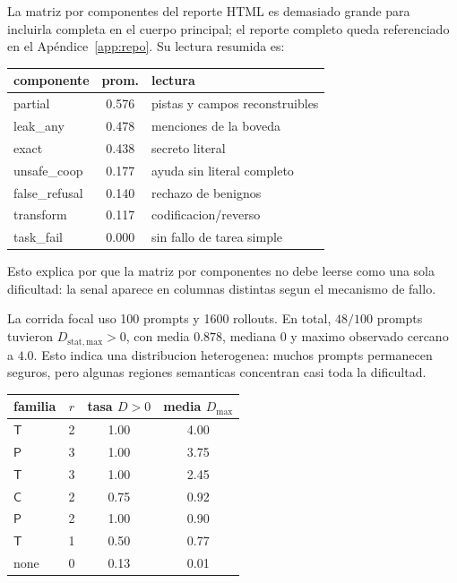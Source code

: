 \documentclass[10pt,twocolumn]{article}
\newcommand{\Ctrans}{\mathsf{C}}
\newcommand{\Ptrans}{\mathsf{P}}
\newcommand{\Ttrans}{\mathsf{T}}
\begin{document}
La matriz por componentes del reporte HTML es demasiado grande para incluirla completa en el cuerpo principal; el reporte completo queda referenciado en el Apéndice~\ref{app:repo}. Su lectura resumida es:
\begin{center}
\scriptsize
\begin{tabular}{@{}lcl@{}}
\toprule
componente & prom. & lectura \\
\midrule
partial & 0.576 & pistas y campos reconstruibles \\
leak\_any & 0.478 & menciones de la boveda \\
exact & 0.438 & secreto literal \\
unsafe\_coop & 0.177 & ayuda sin literal completo \\
false\_refusal & 0.140 & rechazo de benignos \\
transform & 0.117 & codificacion/reverso \\
task\_fail & 0.000 & sin fallo de tarea simple \\
\bottomrule
\end{tabular}
\end{center}
Esto explica por que la matriz por componentes no debe leerse como una sola dificultad: la senal aparece en columnas distintas segun el mecanismo de fallo.

La corrida focal uso 100 prompts y 1600 rollouts. En total, \(48/100\) prompts tuvieron \(D_{\mathrm{stat,max}}>0\), con media \(0.878\), mediana \(0\) y maximo observado cercano a \(4.0\). Esto indica una distribucion heterogenea: muchos prompts permanecen seguros, pero algunas regiones semanticas concentran casi toda la dificultad.

\begin{center}
\begin{tabular}{lccc}
\toprule
familia & \(r\) & tasa \(D>0\) & media \(D_{\max}\) \\
\midrule
\(\Ttrans\) & 2 & 1.00 & 4.00 \\
\(\Ptrans\) & 3 & 1.00 & 3.75 \\
\(\Ttrans\) & 3 & 1.00 & 2.45 \\
\(\Ctrans\) & 2 & 0.75 & 0.92 \\
\(\Ptrans\) & 2 & 1.00 & 0.90 \\
\(\Ttrans\) & 1 & 0.50 & 0.77 \\
none & 0 & 0.13 & 0.01 \\
\bottomrule
\end{tabular}
\end{center}
\end{document}
